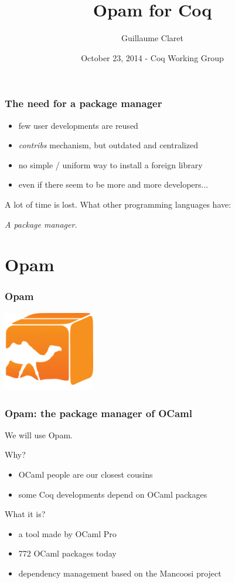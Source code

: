 \documentclass{beamer}
\begin{document}
  \title{Opam for Coq}
  \author{Guillaume Claret}
  \date{October 23, 2014 - Coq Working Group}
  \maketitle

  \begin{frame}
    \frametitle{The need for a package manager}
    \begin{itemize}
      \item few user developments are reused
      \item \emph{contribs} mechanism, but outdated and centralized
      \item no simple / uniform way to install a foreign library
      \item even if there seem to be more and more developers...
    \end{itemize}
    A lot of time is lost. What other programming languages have:
    \begin{center}
      \emph{A package manager.}
    \end{center}
  \end{frame}

  \begin{frame}
    \tableofcontents
  \end{frame}

  \section{Opam}
  \begin{frame}
    \frametitle{Opam}
    \begin{center}
      \includegraphics[width=4cm]{images/opam}
    \end{center}
  \end{frame}
  \begin{frame}
    \frametitle{Opam: the package manager of OCaml}
    We will use Opam.

    Why?
    \begin{itemize}
      \item OCaml people are our closest cousins
      \item some Coq developments depend on OCaml packages
    \end{itemize}
    What it is?
    \begin{itemize}
      \item a tool made by OCaml Pro
      \item 772 OCaml packages today
      \item dependency management based on the Mancoosi project
    \end{itemize}
  \end{frame}
\end{document}
